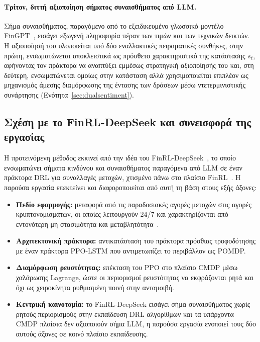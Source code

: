 \paragraph{Τρίτον, διττή αξιοποίηση σήματος συναισθήματος από LLM.}
Σήμα συναισθήματος, παραγόμενο από το εξειδικευμένο γλωσσικό μοντέλο
FinGPT~\cite{yang2023fingpt}, εισάγει εξωγενή πληροφορία πέραν των τιμών και των
τεχνικών δεικτών. Η αξιοποίησή του υλοποιείται υπό δύο εναλλακτικές πειραματικές
συνθήκες, στην πρώτη, ενσωματώνεται αποκλειστικά ως πρόσθετο χαρακτηριστικό
της κατάστασης $s_t$, αφήνοντας τον πράκτορα να αναπτύξει εμμέσως στρατηγική
αξιοποίησής του και, στη δεύτερη, ενσωματώνεται ομοίως στην κατάσταση αλλά
χρησιμοποιείται επιπλέον ως μηχανισμός άμεσης διαμόρφωσης της έντασης των
δράσεων μέσω ντετερμινιστικής συνάρτησης (Ενότητα~\ref{sec:dualsentiment}).

\subsection{Σχέση με το FinRL-DeepSeek και συνεισφορά της εργασίας}

Η προτεινόμενη μέθοδος εκκινεί από την ιδέα του FinRL-DeepSeek~\cite{benhenda2025finrldeepseek},
το οποίο ενσωματώνει σήματα κινδύνου και συναισθήματος παραγόμενα από LLM σε
έναν πράκτορα DRL για συναλλαγές μετοχών, χτισμένο πάνω στο πλαίσιο
FinRL~\cite{liu2018finrl}. Η παρούσα εργασία επεκτείνει και διαφοροποιείται από αυτή
τη βάση στους εξής άξονες:

\begin{itemize}
  \item \textbf{Πεδίο εφαρμογής:} μεταφορά από τις παραδοσιακές αγορές
        μετοχών στις αγορές κρυπτονομισμάτων, οι οποίες λειτουργούν 24/7 και
        χαρακτηρίζονται από εντονότερη μη στασιμότητα και μεταβλητότητα~\cite{liutsyvinski2021, griffin2020bitcoin}.
  \item \textbf{Αρχιτεκτονική πράκτορα:} αντικατάσταση του πράκτορα πρόσθιας
        τροφοδότησης με έναν πράκτορα PPO-LSTM που αντιμετωπίζει το
        περιβάλλον ως POMDP.
  \item \textbf{Διαμόρφωση ρευστότητας:} επέκταση του PPO στο πλαίσιο CMDP
        μέσω χαλάρωσης Lagrange, ώστε οι περιορισμοί ρευστότητας να
        εκφράζονται ρητά και όχι ως χειροκίνητα ρυθμισμένη ποινή στην
        ανταμοιβή.
  \item \textbf{Κεντρική καινοτομία:} το FinRL-DeepSeek εισάγει σήμα
        συναισθήματος χωρίς ρητούς περιορισμούς στην εκπαίδευση DRL αλγορίθμων και τα υπάρχοντα CMDP πλαίσια
        δεν αξιοποιούν σήμα LLM, η παρούσα εργασία ενοποιεί τους δύο αυτούς
        άξονες σε κοινό πλαίσιο εκπαίδευσης.
\end{itemize}


